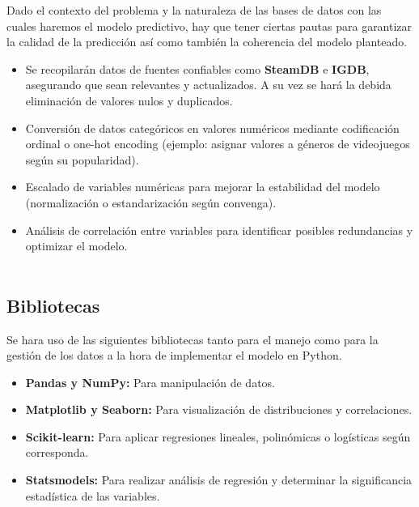 \documentclass[titlepage,a4paper]{article}
\begin{document}
Dado el contexto del problema y la naturaleza de las bases de datos con las cuales haremos el modelo predictivo, hay que tener ciertas pautas para garantizar la calidad de la predicción así como también la coherencia del modelo planteado. \\

\begin{itemize}
    \item Se recopilarán datos de fuentes confiables como \textbf{SteamDB} e \textbf{IGDB}, asegurando que sean relevantes y actualizados. A su vez se hará la debida eliminación de valores nulos y duplicados.\\

    \item Conversión de datos categóricos en valores numéricos mediante codificación ordinal o one-hot encoding (ejemplo: asignar valores a géneros de videojuegos según su popularidad). \\

    \item Escalado de variables numéricas para mejorar la estabilidad del modelo (normalización o estandarización según convenga). \\

    \item Análisis de correlación entre variables para identificar posibles redundancias y optimizar el modelo. \\ \\
    
\end{itemize}

\subsection{Bibliotecas} 
    Se hara uso de las siguientes bibliotecas tanto para el manejo como para la gestión de los datos a la hora de implementar el modelo en Python. \\

\begin{itemize}
    \item \textbf{Pandas y NumPy:} Para manipulación de datos. \\

    \item \textbf{Matplotlib y Seaborn:} Para visualización de distribuciones y correlaciones. \\

    \item  \textbf{Scikit-learn:} Para aplicar regresiones lineales, polinómicas o logísticas según corresponda. \\

    \item \textbf{Statsmodels:} Para realizar análisis de regresión y determinar la significancia estadística de las variables. \\\\
    
\end{itemize}
\end{document}
